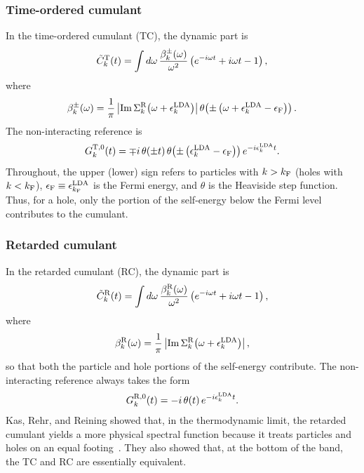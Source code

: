 \documentclass[letterpaper]{article}
\begin{document}
\subsubsection{Time-ordered cumulant}
In the time-ordered cumulant (TC), the dynamic part is
\begin{equation}
    \tilde{C}_k^{\rm T}(t) = \int d\omega\, \frac{\beta_k^{\pm}(\omega)}{\omega^2}\left(e^{-i \omega t}+i \omega t-1\right),
    \label{eq:tc}
\end{equation}
where
\begin{equation}
\beta_k^{\pm}(\omega) = \frac{1}{\pi}\left|\operatorname{Im} \Sigma_k^{\rm R}\!\left(\omega+\epsilon_k^{\rm LDA}\right)\right| \theta\!\left(\pm\left(\omega + \epsilon_k^{\rm LDA} - \epsilon_{\rm F}\right)\right).
\end{equation}
The non-interacting reference is
\begin{equation}
G_k^{{\rm T},0}(t) = \mp i\, \theta(\pm t)\, \theta\!\left(\pm\left(\epsilon_k^{\rm LDA}-\epsilon_{\rm F}\right)\right) e^{-i \epsilon_k^{\rm LDA} t}.
\end{equation}
Throughout, the upper (lower) sign refers to particles with $k>k_{\rm F}$ (holes with $k<k_{\rm F}$), $\epsilon_{\rm F} \equiv \epsilon_{k_{\rm F}}^{\rm LDA}$ is the Fermi energy, and $\theta$ is the Heaviside step function. Thus, for a hole, only the portion of the self-energy below the Fermi level contributes to the cumulant.

\subsubsection{Retarded cumulant}
In the retarded cumulant (RC), the dynamic part is
\begin{equation}
    \tilde{C}_k^{\rm R}(t) = \int d\omega\, \frac{\beta_k^{\rm R}(\omega)}{\omega^2} \left( e^{-i\omega t} + i\omega t - 1 \right),
    \label{eq:rc}
\end{equation}
where
\begin{equation}
\beta_k^{\rm R}(\omega) = \frac{1}{\pi}\left|\operatorname{Im} \Sigma_k^{\rm R}\!\left(\omega+\epsilon_k^{\rm LDA}\right)\right|,
\end{equation}
so that both the particle and hole portions of the self-energy contribute. The non-interacting reference always takes the form
\begin{equation}
G_k^{{\rm R},0}(t) = -i\, \theta(t)\, e^{-i\epsilon_k^{\rm LDA} t}.
\end{equation}
Kas, Rehr, and Reining showed that, in the thermodynamic limit, the retarded cumulant yields a more physical spectral function because it treats particles and holes on an equal footing~\cite{kas2014}. They also showed that, at the bottom of the band, the TC and RC are essentially equivalent.
\end{document}
